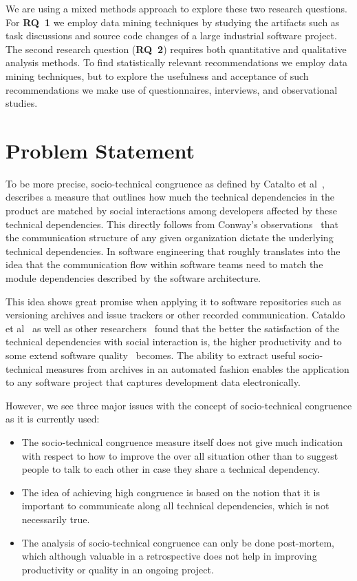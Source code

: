 We are using a mixed methods approach to explore these two research questions.
For \textbf{RQ~1} we employ data mining techniques by studying the artifacts such as task discussions and source code changes of a large industrial software project.
The second research question (\textbf{RQ~2}) requires both quantitative and qualitative analysis methods.
To find statistically relevant recommendations we employ data mining techniques, but to explore the usefulness and acceptance of such recommendations we make use of questionnaires, interviews, and observational studies.

\section{Problem Statement}
To be more precise, socio-technical congruence as defined by Catalto et al~\cite{cataldo:cscw:2006}, describes a measure that outlines how much the technical dependencies in the product are matched by social interactions among developers affected by these technical dependencies.
This directly follows from Conway's observations~\cite{conway:datamination:1968} that the communication structure of any given organization dictate the underlying technical dependencies.
In software engineering that roughly translates into the idea that the communication flow within software teams need to match the module dependencies described by the software architecture. 
 
This idea shows great promise when applying it to software repositories such as versioning archives and issue trackers or other recorded communication.
Cataldo et al~\cite{cataldo:cscw:2006,cataldo:esem:2008} as well as other researchers~\cite{valetto:msr:2007,ehrlich:stc:2008} found that the better the satisfaction of the technical dependencies with social interaction is, the higher productivity and to some extend software quality~\cite{kwan:tse:2011,bird:issre:2009,kwan:stc:2009} becomes.
The ability to extract useful socio-technical measures from archives in an automated fashion enables the application to any software project that captures development data electronically.

However, we see three major issues with the concept of socio-technical congruence as it is currently used:
\begin{itemize}
\item The socio-technical congruence measure itself does not give much indication with respect to how to improve the over all situation other than to suggest people to talk to each other in case they share a technical dependency. 
\item The idea of achieving high congruence is based on the notion that it is important to communicate along all technical dependencies, which is not necessarily true.
\item The analysis of socio-technical congruence can only be done post-mortem, which although valuable in a retrospective does not help in improving productivity or quality in an ongoing project.
\end{itemize}

